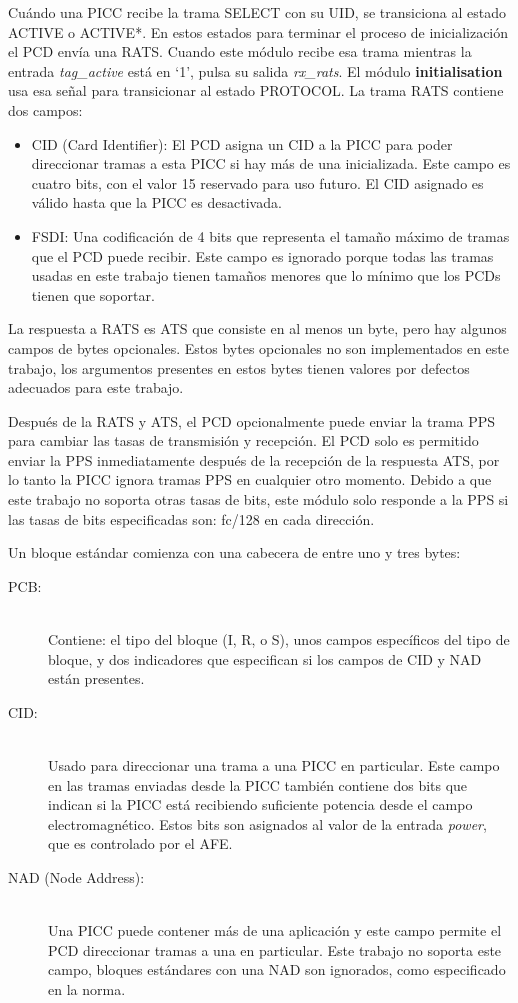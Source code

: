 \documentclass[a4paper, twoside, 11pt]{report}
\begin{document}
Cuándo una PICC recibe la trama SELECT con su UID, se transiciona al estado ACTIVE o ACTIVE*. En estos estados para terminar el proceso de inicialización el PCD envía una RATS. Cuando este módulo recibe esa trama mientras la entrada \textit{tag\_active} está en ‘1’, pulsa su salida \textit{rx\_rats}. El módulo \textbf{initialisation} usa esa señal para transicionar al estado PROTOCOL. La trama RATS contiene dos campos:

\begin{itemize}
  \item CID (Card Identifier): El PCD asigna un CID a la PICC para poder direccionar tramas a esta PICC si hay más de una inicializada. Este campo es cuatro bits, con el valor 15 reservado para uso futuro. El CID asignado es válido hasta que la PICC es desactivada.
  \item FSDI: Una codificación de 4 bits que representa el tamaño máximo de tramas que el PCD puede recibir. Este campo es ignorado porque todas las tramas usadas en este trabajo tienen tamaños menores que lo mínimo que los PCDs tienen que soportar.
\end{itemize}

La respuesta a RATS es ATS que consiste en al menos un byte, pero hay algunos campos de bytes opcionales. Estos bytes opcionales no son implementados en este trabajo, los argumentos presentes en estos bytes tienen valores por defectos adecuados para este trabajo.

Después de la RATS y ATS, el PCD opcionalmente puede enviar la trama PPS para cambiar las tasas de transmisión y recepción. El PCD solo es permitido enviar la PPS inmediatamente después de la recepción de la respuesta ATS, por lo tanto la PICC ignora tramas PPS en cualquier otro momento. Debido a que este trabajo no soporta otras tasas de bits, este módulo solo responde a la PPS si las tasas de bits especificadas son: fc/128 en cada dirección.

Un bloque estándar comienza con una cabecera de entre uno y tres bytes:

\begin{description}
  \item[PCB:] \hfill \\ Contiene: el tipo del bloque (I, R, o S), unos campos específicos del tipo de bloque, y dos indicadores que especifican si los campos de CID y NAD están presentes.
  \item[CID:] \hfill \\ Usado para direccionar una trama a una PICC en particular. Este campo en las tramas enviadas desde la PICC también contiene dos bits que indican si la PICC está recibiendo suficiente potencia desde el campo electromagnético. Estos bits son asignados al valor de la entrada \textit{power}, que es controlado por el AFE.
  \item[NAD (Node Address):] \hfill \\ Una PICC puede contener más de una aplicación y este campo permite el PCD direccionar tramas a una en particular. Este trabajo no soporta este campo, bloques estándares con una NAD son ignorados, como especificado en la norma.
\end{description}
\end{document}
